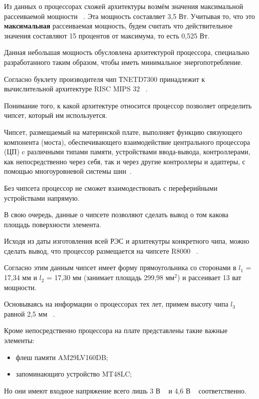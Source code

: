 Из данных о процессорах схожей архитектуры возмём значения максимальной
рассеиваемой мощности ~\cite{MIPSCPU}.
Эта мощность составляет 3,5 Вт.
Учитывая то, что это \textbf{максимальная} рассеиваемая мощность,
будем считать что действительное значения составляют 15 процентов от
максимума, то есть 0,525 Вт.

Данная небольшая мощность обусловлена архитектурой процессора,
специально разработанного таким образом, чтобы иметь минимальное
энергопотребление.

Согласно буклету производителя чип ТNETD7300 принадлежит к
вычислительной архитектуре RISC MIPS 32 ~\cite{AR7-fact-sheet}.

Понимание того, к какой архитектуре относится процессор позволяет
определить чипсет, который им используется.

Чипсет, размещаемый на материнской плате, выполняет функцию связующего
компонента (моста), обеспечивающего взаимодействие центрального
процессора (ЦП) c различными типами памяти, устройствами ввода-вывода,
контроллерами, как непосредственно через себя, так и через другие
контроллеры и адаптеры, с помощью многоуровневой системы
шин~\cite{Avdeev2019}.


Без чипсета процессор не сможет взаимодествовать с переферийными
устройствами напрямую.

В свою очередь, данные о
чипсете позволяют сделать вывод о том какова площадь поверхности
элемента.


Исходя из даты изготовления всей РЭС и архитекутры конкретного чипа,
можно сделать вывод, что процессор размещается на чипсете R8000
~\cite{R8000-physical-wikipedia}.

Согласно этим данным чипсет имеет форму прямоугольника со сторонами в
$l_1$ = 17,34 мм и $l_2$ = 17,30 мм (занимает площадь 299,98 мм$^2$) и
рассеивает 13 ват мощности.


Основываясь на информации о процессорах тех лет, примем высоту чипа
$l_3$ равной 2,5 мм ~\cite{MobilePentium3-wikipedia}.


Кроме непосредственно процессора на плате представлены такие важные элементы:
\begin{itemize}[nosep]
\item флеш памяти AM29LV160DB;
\item запоминающиго устройство MT48LC;
\end{itemize}

Но они имеют входное напряжение всего лишь 3 В ~\cite{SDRAM-Datasheet}
и 4,6 В ~\cite{FlashMemoryDatasheet}
соответственно.


